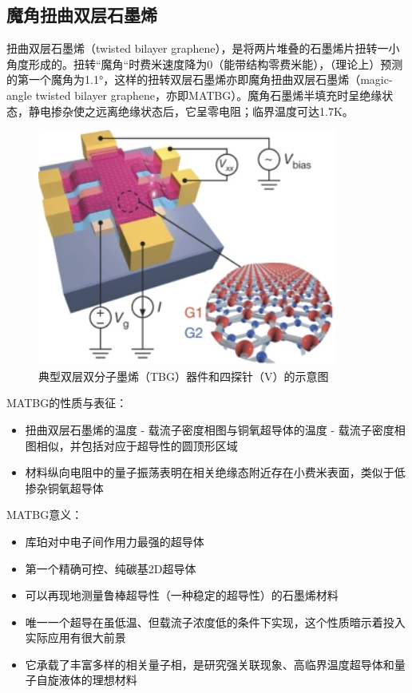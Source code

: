 \subsection{魔角扭曲双层石墨烯}

扭曲双层石墨烯（twisted bilayer graphene），是将两片堆叠的石墨烯片扭转一小角度形成的。扭转“魔角“时费米速度降为0（能带结构零费米能），（理论上）预测的第一个魔角为1.1°，这样的扭转双层石墨烯亦即魔角扭曲双层石墨烯（magic-angle twisted bilayer graphene，亦即MATBG）。魔角石墨烯半填充时呈绝缘状态，静电掺杂使之远离绝缘状态后，它呈零电阻；临界温度可达1.7K。

\begin{figure}
    \centering
    \includegraphics[scale=0.7]{img/魔角双层.png}
    \caption{典型双层双分子墨烯（TBG）器件和四探针（V）的示意图}
\end{figure}

MATBG的性质与表征：

\begin{itemize}
    \item 扭曲双层石墨烯的温度 - 载流子密度相图与铜氧超导体的温度 - 载流子密度相图相似，并包括对应于超导性的圆顶形区域
    \item 材料纵向电阻中的量子振荡表明在相关绝缘态附近存在小费米表面，类似于低掺杂铜氧超导体
\end{itemize}

\smallskip

MATBG意义：

\begin{itemize}
    \item 库珀对中电子间作用力最强的超导体
    \item 第一个精确可控、纯碳基2D超导体
    \item 可以再现地测量鲁棒超导性（一种稳定的超导性）的石墨烯材料
    \item 唯一一个超导在虽低温、但载流子浓度低的条件下实现，这个性质暗示着投入实际应用有很大前景
    \item 它承载了丰富多样的相关量子相，是研究强关联现象、高临界温度超导体和量子自旋液体的理想材料
\end{itemize}

